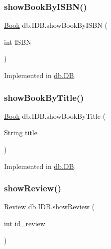 \subsubsection{\texorpdfstring{show\+Book\+By\+I\+S\+B\+N()}{showBookByISBN()}}
{\footnotesize\ttfamily \hyperlink{classserver_1_1data_1_1_book}{Book} db.\+I\+D\+B.\+show\+Book\+By\+I\+S\+BN (\begin{DoxyParamCaption}\item[{int}]{I\+S\+BN }\end{DoxyParamCaption})}



Implemented in \hyperlink{classdb_1_1_d_b_ae902ce95ca7433f1f7f77419f4121f4c}{db.\+DB}.

\mbox{\label{interfacedb_1_1_i_d_b_a6418edaf7c25f99f0422c0000db521fa}} 
\subsubsection{\texorpdfstring{show\+Book\+By\+Title()}{showBookByTitle()}}
{\footnotesize\ttfamily \hyperlink{classserver_1_1data_1_1_book}{Book} db.\+I\+D\+B.\+show\+Book\+By\+Title (\begin{DoxyParamCaption}\item[{String}]{title }\end{DoxyParamCaption})}



Implemented in \hyperlink{classdb_1_1_d_b_a22a4c5b98facd4506b03828697220773}{db.\+DB}.

\mbox{\label{interfacedb_1_1_i_d_b_a6c44c3135f07ec6dbef84ecc6fe4f90f}} 
\subsubsection{\texorpdfstring{show\+Review()}{showReview()}}
{\footnotesize\ttfamily \hyperlink{classserver_1_1data_1_1_review}{Review} db.\+I\+D\+B.\+show\+Review (\begin{DoxyParamCaption}\item[{int}]{id\+\_\+review }\end{DoxyParamCaption})}



